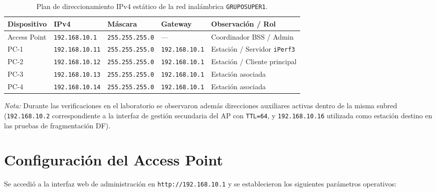 \documentclass[11pt, a4paper]{article}
\begin{document}
\begin{table}[h!]
\centering
\small
\setlength{\tabcolsep}{4pt}
\caption{Plan de direccionamiento IPv4 estático de la red inalámbrica \texttt{GRUPOSUPER1}.}
\begin{tabularx}{\textwidth}{>{\raggedright\arraybackslash}p{2.6cm} >{\centering\arraybackslash}X >{\centering\arraybackslash}X >{\centering\arraybackslash}X >{\raggedright\arraybackslash}X}
\toprule
\textbf{Dispositivo} & \textbf{IPv4} & \textbf{Máscara} & \textbf{Gateway} & \textbf{Observación / Rol} \\
\midrule
Access Point & \texttt{192.168.10.1} & \texttt{255.255.255.0} & --- & Coordinador BSS / Admin \\
PC-1 & \texttt{192.168.10.11} & \texttt{255.255.255.0} & \texttt{192.168.10.1} & Estación / Servidor \texttt{iPerf3} \\
PC-2 & \texttt{192.168.10.12} & \texttt{255.255.255.0} & \texttt{192.168.10.1} & Estación / Cliente principal \\
PC-3 & \texttt{192.168.10.13} & \texttt{255.255.255.0} & \texttt{192.168.10.1} & Estación asociada \\
PC-4 & \texttt{192.168.10.14} & \texttt{255.255.255.0} & \texttt{192.168.10.1} & Estación asociada \\
\bottomrule
\end{tabularx}
\end{table}

\noindent \textit{Nota:} Durante las verificaciones en el laboratorio se observaron además direcciones auxiliares activas dentro de la misma subred (\texttt{192.168.10.2} correspondiente a la interfaz de gestión secundaria del AP con \texttt{TTL=64}, y \texttt{192.168.10.16} utilizada como estación destino en las pruebas de fragmentación DF).

\section{Configuración del Access Point}

Se accedió a la interfaz web de administración en \texttt{http://192.168.10.1} y se establecieron los siguientes parámetros operativos:
\end{document}
